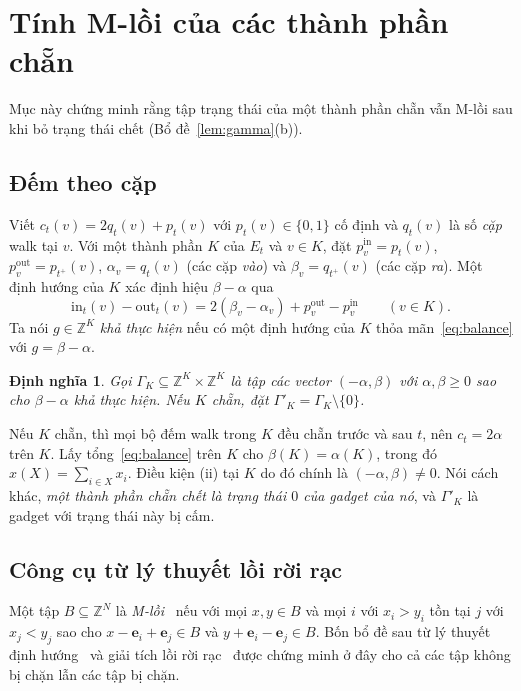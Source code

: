 \documentclass[pdflatex,sn-mathphys-num]{sn-jnl}
\theoremstyle{thmstyleone}%
\theoremstyle{thmstyletwo}%
\theoremstyle{thmstylethree}%
\newtheorem{definition}{Định nghĩa}%
\newcommand{\Z}{\mathbb{Z}}
\newcommand{\e}{\mathbf{e}}
\newcommand{\out}{\mathrm{out}}
\newcommand{\inn}{\mathrm{in}}
\begin{document}
\section{Tính M-lồi của các thành phần chẵn}\label{sec:mconvex}

Mục này chứng minh rằng tập trạng thái của một thành phần chẵn vẫn M-lồi sau khi bỏ trạng thái chết (Bổ đề~\ref{lem:gamma}(b)).

\subsection{Đếm theo cặp}

Viết $c_t(v)=2q_t(v)+p_t(v)$ với $p_t(v)\in\{0,1\}$ cố định và $q_t(v)$ là số \emph{cặp} walk tại $v$. Với một thành phần $K$ của $E_t$ và $v\in K$, đặt $p^{\inn}_v=p_t(v)$, $p^{\out}_v=p_{t^+}(v)$, $\alpha_v=q_t(v)$ (các cặp \emph{vào}) và $\beta_v=q_{t^+}(v)$ (các cặp \emph{ra}). Một định hướng của $K$ xác định hiệu $\beta-\alpha$ qua
\begin{equation}\label{eq:balance}
  \inn_t(v)-\out_t(v)=2(\beta_v-\alpha_v)+p^{\out}_v-p^{\inn}_v\qquad (v\in K).
\end{equation}
Ta nói $g\in\Z^K$ \emph{khả thực hiện} nếu có một định hướng của $K$ thỏa mãn~\eqref{eq:balance} với $g=\beta-\alpha$.

\begin{definition}\label{def:gamma}
Gọi $\Gamma_K\subseteq\Z^{K}\times\Z^{K}$ là tập các vector $(-\alpha,\beta)$ với $\alpha,\beta\ge0$ sao cho $\beta-\alpha$ khả thực hiện. Nếu $K$ chẵn, đặt $\Gamma'_K=\Gamma_K\setminus\{0\}$.
\end{definition}

Nếu $K$ chẵn, thì mọi bộ đếm walk trong $K$ đều chẵn trước và sau $t$, nên $c_t=2\alpha$ trên $K$. Lấy tổng~\eqref{eq:balance} trên $K$ cho $\beta(K)=\alpha(K)$, trong đó $x(X)=\sum_{i\in X}x_i$. Điều kiện (ii) tại $K$ do đó chính là $(-\alpha,\beta)\ne0$. Nói cách khác, \emph{một thành phần chẵn chết là trạng thái $0$ của gadget của nó}, và $\Gamma'_K$ là gadget với trạng thái này bị cấm.

\subsection{Công cụ từ lý thuyết lồi rời rạc}

Một tập $B\subseteq\Z^N$ là \emph{M-lồi}~\cite{murota2003} nếu với mọi $x,y\in B$ và mọi $i$ với $x_i>y_i$ tồn tại $j$ với $x_j<y_j$ sao cho $x-\e_i+\e_j\in B$ và $y+\e_i-\e_j\in B$. Bốn bổ đề sau từ lý thuyết định hướng~\cite{frank2011} và giải tích lồi rời rạc~\cite{murota2003,fujishige2005} được chứng minh ở đây cho cả các tập không bị chặn lẫn các tập bị chặn.
\end{document}
